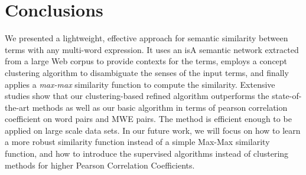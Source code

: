 \section{Conclusions}
\label{sec:conclude}

We presented a lightweight, effective approach for
semantic similarity between terms with any multi-word expression.
It uses an isA semantic network extracted from a large Web corpus
to provide contexts for the terms, employs a concept clustering algorithm
to disambiguate the senses of the input terms, and finally applies
a {\em max-max} similarity function to compute the similarity.
Extensive studies show that our clustering-based refined algorithm outperforms the state-of-the-art methods as well
as our basic algorithm in terms of pearson correlation coefficient on word pairs and MWE pairs.
The method is efficient enough to be applied on large scale data sets.
In our future work, we will focus on how to learn a more
robust similarity function instead of a simple Max-Max similarity function, and how to introduce the supervised algorithms instead of clustering methods for higher Pearson Correlation Coefficients.
